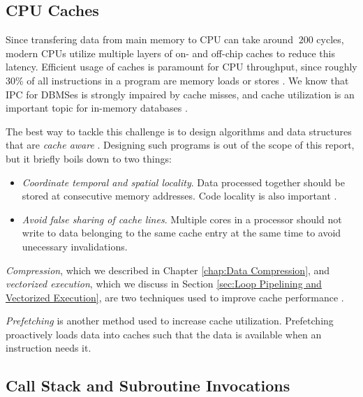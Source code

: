 \subsection{CPU Caches}
\label{sub:CPU Caches}
Since transfering data from main memory to CPU can take around $~200$ cycles, modern CPUs utilize multiple layers of on- and off-chip caches to reduce this latency. Efficient usage of caches is paramount for CPU throughput, since roughly 30\% of all instructions in a program are memory loads or stores \cite{Boncz2005-wj}. We know that IPC for DBMSes is strongly impaired by cache misses, and cache utilization is an important topic for in-memory databases \cite{Exasol2014-xh}.

The best way to tackle this challenge is to design algorithms and data structures that are \textit{cache aware} \cite{Farber2012-vh}. Designing such programs is out of the scope of this report, but it briefly boils down to two things:
\begin{itemize}
  \item \textit{Coordinate temporal and spatial locality}. Data processed together should be stored at consecutive memory addresses. Code locality is also important \cite{Neumann2011-uq}.
  \item \textit{Avoid false sharing of cache lines}. Multiple cores in a processor should not write to data belonging to the same cache entry at the same time to avoid unecessary invalidations.
\end{itemize}
\textit{Compression}, which we described in Chapter \ref{chap:Data Compression}, and \textit{vectorized execution}, which we discuss in Section \ref{sec:Loop Pipelining and Vectorized Execution}, are two techniques used to improve cache performance \cite{Larson2013-mc, Lemke2010-is}.

\textit{Prefetching} is another method used to increase cache utilization. Prefetching proactively loads data into caches such that the data is available when an instruction needs it.

\subsection{Call Stack and Subroutine Invocations}
\label{sub:Call Stack and Subroutine Invocations}

